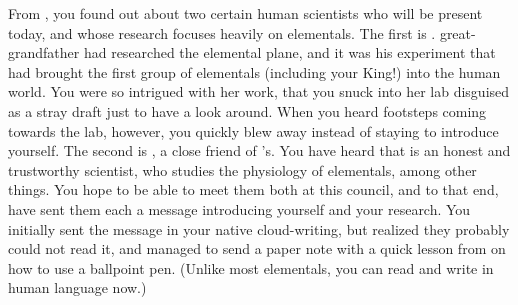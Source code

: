 \documentclass[char]{elementals}
\begin{document}
From \cDiplomat{}, you found out about two certain human scientists who will be present today, and whose research focuses heavily on elementals.  The first is \cGD{\intro}.  \cGD{\Their} great-grandfather had researched the elemental plane, and it was his experiment that had brought the first group of elementals (including your King!) into the human world.  You were so intrigued with her work, that you snuck into her lab disguised as a stray draft just to have a look around.  When you heard footsteps coming towards the lab, however, you quickly blew away instead of staying to introduce yourself.  The second is \cScientist{\intro}, a close friend of \cDiplomat{}'s.  You have heard that \cScientist{} is an honest and trustworthy scientist, who studies the physiology of elementals, among other things.  You hope to be able to meet them both at this council, and to that end, have sent them each a message introducing yourself and your research.  You initially sent the message in your native cloud-writing, but realized they probably could not read it, and managed to send a paper note with a quick lesson from \cDiplomat{} on how to use a ballpoint pen. (Unlike most elementals, you can read and write in human language now.)
\end{document}
